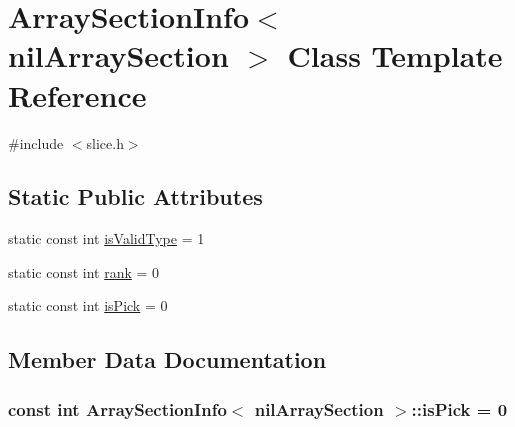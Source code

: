 \hypertarget{classArraySectionInfo_3_01nilArraySection_01_4}{}\section{Array\+Section\+Info$<$ nil\+Array\+Section $>$ Class Template Reference}
\label{classArraySectionInfo_3_01nilArraySection_01_4}


{\ttfamily \#include $<$slice.\+h$>$}

\subsection*{Static Public Attributes}
\begin{DoxyCompactItemize}
\item 
static const int \hyperlink{classArraySectionInfo_3_01nilArraySection_01_4_acca4a9cf0f1aaf88ed29b38db9c402cf}{is\+Valid\+Type} = 1
\item 
static const int \hyperlink{classArraySectionInfo_3_01nilArraySection_01_4_ae2b3a2216bbca26ef42f990a706df85d}{rank} = 0
\item 
static const int \hyperlink{classArraySectionInfo_3_01nilArraySection_01_4_a0d8a714a050b608b5e42f53da677e119}{is\+Pick} = 0
\end{DoxyCompactItemize}


\subsection{Member Data Documentation}
\hypertarget{classArraySectionInfo_3_01nilArraySection_01_4_a0d8a714a050b608b5e42f53da677e119}{}
\subsubsection[{is\+Pick}]{\setlength{\rightskip}{0pt plus 5cm}const int {\bf Array\+Section\+Info}$<$ {\bf nil\+Array\+Section} $>$\+::is\+Pick = 0\hspace{0.3cm}{\ttfamily [static]}}\label{classArraySectionInfo_3_01nilArraySection_01_4_a0d8a714a050b608b5e42f53da677e119}
\hypertarget{classArraySectionInfo_3_01nilArraySection_01_4_acca4a9cf0f1aaf88ed29b38db9c402cf}{}
